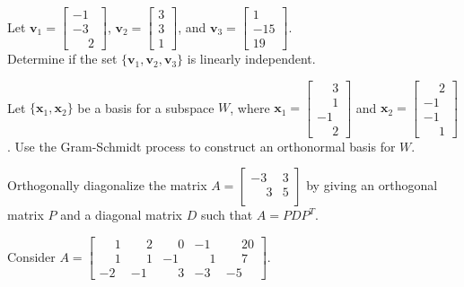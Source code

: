 \documentclass[11pt]{exam}
\begin{document}
\begin{questions}
\addpoints
\question[5] Let $\mathbf{v}_{1}=\left[ \begin{array}{c} -1 \\ -3 \\ \phantom{-}2 \end{array} \right]$, $\mathbf{v}_{2}=\left[ \begin{array}{c} 3 \\ 3 \\ 1 \end{array} \right]$, and $\mathbf{v}_{3}=\left[ \begin{array}{c} 1 \\ -15 \\ 19 \end{array} \right]$. \\ Determine if the set $\{\mathbf{v}_{1}, \mathbf{v}_{2}, \mathbf{v}_{3}\}$ is linearly independent.

\question[5] Let $\{\mathbf{x}_{1}, \mathbf{x}_{2}\}$ be a basis for a subspace $W$, where $\mathbf{x}_{1}=\left[ \begin{array}{c} \phantom{-}3 \\ \phantom{-}1 \\ -1 \\ \phantom{-}2 \end{array} \right]$ and $\mathbf{x}_{2}=\left[ \begin{array}{c} \phantom{-}2 \\ -1 \\ -1 \\ \phantom{-}1 \end{array} \right]$. Use the Gram-Schmidt process to construct an orthonormal basis for $W$.

\newpage
\question[5] Orthogonally diagonalize the matrix $A= \left[\begin{array}{cc}-3 & 3 \\ \phantom{-}3 & 5 \\ \end{array}\right]$ by giving an orthogonal matrix $P$ and a diagonal matrix $D$ such that $A=PDP^{T}$.

\addpoints
\question Consider $A=\left[\begin{array}{ccccc}\phantom{-}1 & \phantom{-}2 & \phantom{-}0 & -1 & \phantom{-}20 \\ \phantom{-}1 & \phantom{-}1 & -1 & \phantom{-}1 & \phantom{-}7 \\ -2 & -1 & \phantom{-}3 & -3 & -5\end{array}\right]$. 
\begin{parts}

\end{parts}
\end{questions}
\end{document}
